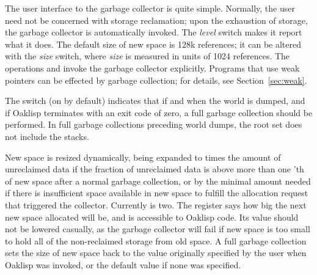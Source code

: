 The user interface to the garbage collector is quite simple.
Normally, the user need not be concerned with storage reclamation;
upon the exhaustion of storage, the garbage collector is automatically
invoked.  The  \emph{level} switch makes it
report what it does.  The default size of new space is 128k
references; it can be altered with the 
\emph{size} switch, where \emph{size} is measured in units of 1024
references.  The operations  and  invoke the
garbage collector explicitly.  Programs that use weak pointers can be
effected by garbage collection; for details, see
Section~\ref{sec:weak}.

The  switch (on by default) indicates that if
and when the world is dumped, and if Oaklisp terminates with an exit
code of zero, a full garbage collection should be performed.  In full
garbage collections preceding world dumps, the root set does not
include the stacks.

New space is resized dynamically, being expanded to
 times the amount of unreclaimed data if
the fraction of unreclaimed data is above more than one
'th of new space after a normal garbage
collection, or by the minimal amount needed if there is insufficient
space available in new space to fulfill the allocation request that
triggered the collector.  Currently  is
two.  The  register says how
big the next new space allocated will be, and is accessible to Oaklisp
code.  Its value should not be lowered casually, as the garbage
collector will fail if new space is too small to hold all of the
non-reclaimed storage from old space.  A full garbage collection sets
the size of new space back to the value originally specified by the
user when Oaklisp was invoked, or the default value if none was
specified.
